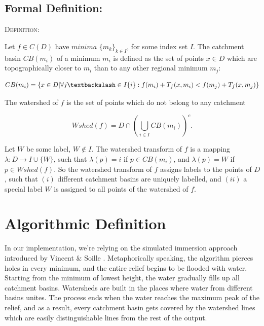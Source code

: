 \documentclass{article}
\begin{document}
\subsection{Formal Definition:}
\begin{flushleft}
\vspace{2mm }
\begin{tcolorbox}
\textsc{Definition: }\cite{parwshed} \newline\newline

Let $f \in C(D)$ have $minima$ $\{m_{k}\}_{k \in I}$, for some index set $I$. The catchment basin $CB(m_i)$ of a minimum $m_i$ is defined as the set of points $x \in D$ which are topographically closer to $m_i$ than to any other regional minimum $m_j$:
\begin{center}
\begin{equation*}
    CB(m_i) = \{x \in D | \forall j \textbackslash \in I\{i\} : f(m_i) + T_f(x, m_i) < f(m_j) + T_f(x, m_j)\}
\end{equation*}
\end{center}
\vspace{2mm}
The watershed of $f$ is the set of points which do not belong to any catchment
\begin{center}
\begin{equation*}
Wshed(f) = D \cap \left(\bigcup\limits_{i \in I} CB(m_i)\right)^c.
\end{equation*}
\end{center}
\vspace{4mm}
Let $W$ be some label, $W \notin I$. The watershed transform of $f$ is a mapping $\lambda : D \to I \cup \{W\}$, such that $\lambda(p) = i$ if $p \in CB(m_i)$, and $\lambda(p) = W$ if $p \in Wshed(f)$.
\newline\newline\newline
So the watershed transform of $f$ assigns labels to the points of $D$, such that $(i)$ different catchment basins are uniquely labelled, and $(ii)$ a special label $W$ is assigned to all points of the watershed of $f$.
\end{tcolorbox}
\end{flushleft}



\section{Algorithmic Definition}
\vspace{2mm}In our implementation, we're relying on the simulated immersion approach introduced by Vincent \& Soille \cite{soilletextbook}. \newline\newline
Metaphorically speaking, the algorithm pierces holes in every minimum, and the entire relief begins to be flooded with water. Starting from the minimum of lowest height, the water gradually fills up all catchment basins. Watersheds are built in the places where water from different basins unites. The process ends when the water reaches the maximum peak of the relief, and as a result, every catchment basin gets covered by the watershed lines which are easily distinguishable lines from the rest of the output.
\end{document}
